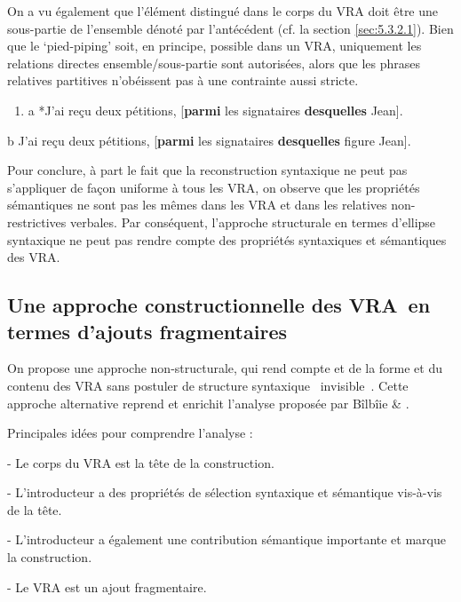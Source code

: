 On a vu également que l'élément distingué dans le corps du VRA doit être une sous-partie de l'ensemble dénoté par l'antécédent (cf. la section \ref{sec:5.3.2.1}). Bien que le `pied-piping' soit, en principe, possible dans un VRA, uniquement les relations directes ensemble/sous-partie sont autorisées, alors que les phrases relatives partitives n'obéissent pas à une contrainte aussi stricte.  


\begin{enumerate}
\item a  *J'ai reçu deux pétitions, [\textbf{parmi} les signataires\textbf{ desquelles} Jean]. 


\end{enumerate}
  b  J'ai reçu deux pétitions, [\textbf{parmi} les signataires\textbf{ desquelles} figure Jean]. 

Pour conclure, à part le fait que la reconstruction syntaxique ne peut pas s'appliquer de façon uniforme à tous les VRA, on observe que les propriétés sémantiques ne sont pas les mêmes dans les VRA et dans les relatives non-restrictives verbales. Par conséquent, l'approche structurale en termes d'ellipse syntaxique ne peut pas rendre compte des propriétés syntaxiques et sémantiques des VRA. 

\subsection{Une approche constructionnelle des VRA~en termes d'ajouts fragmentaires}
On propose une approche non-structurale, qui rend compte et de la forme et du contenu des VRA sans postuler de structure syntaxique {\guillemotleft}~invisible~{\guillemotright}. Cette approche alternative reprend et enrichit l'analyse proposée par Bîlbîie \& \citet{Laurens2009}. 

Principales idées pour comprendre l'analyse :

{}- Le corps du VRA est la tête de la construction.

{}- L'introducteur a des propriétés de sélection syntaxique et sémantique vis-à-vis de la tête.

{}- L'introducteur a également une contribution sémantique importante et marque la construction.

{}- Le VRA est un ajout fragmentaire.

